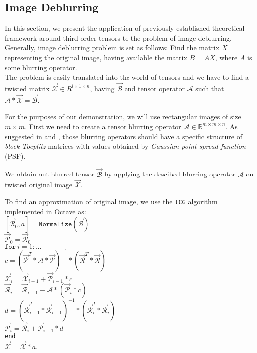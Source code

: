 \documentclass[twoside]{article}
\newcommand{\code}[1]{\texttt{#1}}
\begin{document}
\begin{multicols}{2}
\section{Image Deblurring}
In this section, we present the application of previously established theoretical framework around third-order tensors to the problem of image deblurring.\\
Generally, image deblurring problem is set as follows: Find the matrix $X$ representing the original image, having available the matrix $B = A X$, where $A$ is some blurring operator.\\
The problem is easily translated into the world of tensors and we have to find a twisted matrix $\overrightarrow{\mathcal{X}} \in R^{l \times 1 \times n}$, having $\overrightarrow{\mathcal{B}}$ and tensor operator $\mathcal{A}$ such that $\mathcal{A} \ast \overrightarrow{\mathcal{X}} = \overrightarrow{\mathcal{B}}$.

For the purposes of our demonstration, we will use rectangular images of size $m \times m$. First we need to create a tensor blurring operator $\mathcal{A} \in \mathbb{R}^{m \times m \times n}$. As suggested in \cite{kilmer-braman-hao} and \cite{kilmer-martin}, those blurring operators should have a specific structure of \textit{block Toeplitz} matrices with values obtained by \textit{Gaussian point spread function} (PSF).

We obtain out blurred tensor $\overrightarrow{\mathcal{B}}$ by applying the descibed blurring operator $\mathcal{A}$ on twisted original image $\overrightarrow{\mathcal{X}}$.

To find an approximation of original image, we use the \code{tCG} algorithm implemented in Octave as:\\
$[\overrightarrow{\mathcal{R}}_0,a] = \code{Normalize}(\overrightarrow{\mathcal{B}})$\\
$\overrightarrow{\mathcal{P}}_0 = \overrightarrow{\mathcal{R}}_0$\\
$\code{for}\ i=1:...$\\
\indent $c = (\overrightarrow{\mathcal{P}}^T \ast \mathcal{A} \ast \overrightarrow{\mathcal{P}})^{-1} \ast (\overrightarrow{\mathcal{R}}^T \ast \overrightarrow{\mathcal{R}})$\\
\indent $\overrightarrow{\mathcal{X}}_i = \overrightarrow{\mathcal{X}}_{i-1} + \overrightarrow{\mathcal{P}}_{i-1} \ast c$\\
\indent $\overrightarrow{\mathcal{R}}_i = \overrightarrow{\mathcal{R}}_{i-1} - \mathcal{A} \ast (\overrightarrow{\mathcal{P}}_i \ast c)$\\
\indent $d = (\overrightarrow{\mathcal{R}}^T_{i-1} \ast \overrightarrow{\mathcal{R}}_{i-1})^{-1} \ast (\overrightarrow{\mathcal{R}}^T_i \ast \overrightarrow{\mathcal{R}}_i)$\\
\indent $\overrightarrow{\mathcal{P}}_i = \overrightarrow{\mathcal{R}}_i + \overrightarrow{\mathcal{P}}_{i-1} \ast d$\\
\code{end}\\
$\overrightarrow{\mathcal{X}} = \overrightarrow{\mathcal{X}} \ast a$.\\


\end{multicols}
\end{document}
